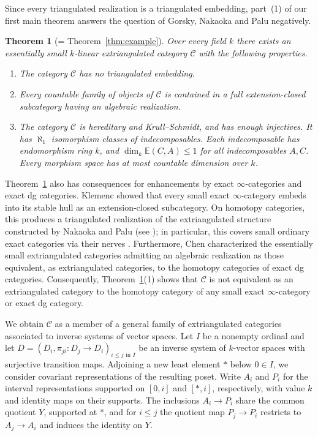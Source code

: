 \documentclass[a4paper,reqno,10pt]{amsart}
\numberwithin{equation}{section}
\newtheorem{introthm}{Theorem}
\theoremstyle{definition}
\newcommand{\C}{\mathcal C}
\newcommand{\E}{\mathbb E}
\begin{document}
Since every triangulated realization is a triangulated embedding, part~(1) of
our first main theorem answers the question of Gorsky, Nakaoka and Palu
negatively.

\begin{introthm}[= Theorem~\ref{thm:example}]\label{intro:example}
Over every field $k$ there exists an essentially small $k$-linear
extriangulated category $\C$ with the following properties.
\begin{enumerate}
\item The category $\C$ has no triangulated embedding.
\item Every countable family of objects of $\C$ is contained in a full
extension-closed subcategory having an algebraic realization.
\item The category $\C$ is hereditary and Krull--Schmidt, and has enough
injectives. It has $\aleph_1$ isomorphism classes of indecomposables.
Each indecomposable has endomorphism ring $k$, and
$\dim_k\E(C,A)\leq 1$ for all indecomposables $A,C$. Every morphism space
has at most countable dimension over $k$.
\end{enumerate}
\end{introthm}

Theorem~\ref{intro:example} also has consequences for enhancements by exact
$\infty$-categories and exact dg categories. Klemenc \cite[Theorem~1.2]{Kl}
showed that every small exact $\infty$-category embeds into its stable hull as
an extension-closed subcategory. On homotopy categories, this produces a triangulated realization of
the extriangulated structure constructed by Nakaoka and Palu
\cite[Theorem~4.22]{NP2} (see \cite[\S5.5, before Question~5.40]{GNP}); in
particular, this covers small ordinary exact categories via their nerves
\cite[\S4.3]{Kl}. Furthermore, Chen \cite[Proposition-Definition~3.15]{Ch}
characterized the essentially small extriangulated categories admitting an
algebraic realization as those equivalent, as extriangulated categories, to the
homotopy categories of exact dg categories. Consequently,
Theorem~\ref{intro:example}(1) shows that $\C$ is not equivalent as an
extriangulated category to the homotopy category of any small exact
$\infty$-category or exact dg category.

We obtain $\C$ as a member of a general family of extriangulated categories
associated to inverse systems of vector spaces. Let $I$ be a nonempty ordinal
and let $D=(D_i,\pi_{ji}:D_j\to D_i)_{i\le j\text{ in }I}$ be an inverse system
of $k$-vector spaces with surjective transition maps. Adjoining a new least
element $*$ below $0\in I$, we consider covariant representations of the
resulting poset. Write $A_i$ and $P_i$ for the interval representations
supported on $[0,i]$ and $[*,i]$, respectively, with value $k$ and identity
maps on their supports. The inclusions $A_i\to P_i$ share the common quotient
$Y$, supported at $*$, and for $i\le j$ the quotient map $P_j\to P_i$ restricts
to $A_j\to A_i$ and induces the identity on $Y$.
\end{document}
